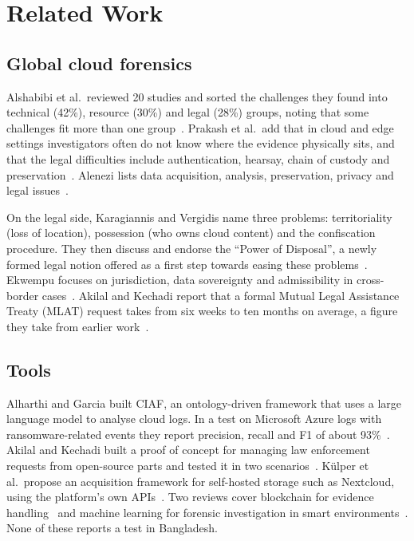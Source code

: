 \documentclass[conference]{IEEEtran}
\begin{document}
\section{Related Work}
\subsection{Global cloud forensics}
Alshabibi et al.\ reviewed 20 studies and sorted the challenges they found into technical (42\%), resource (30\%) and legal (28\%) groups, noting that some challenges fit more than one group~\cite{alshabibi}. Prakash et al.\ add that in cloud and edge settings investigators often do not know where the evidence physically sits, and that the legal difficulties include authentication, hearsay, chain of custody and preservation~\cite{prakash}. Alenezi lists data acquisition, analysis, preservation, privacy and legal issues~\cite{alenezi}.

On the legal side, Karagiannis and Vergidis name three problems: territoriality (loss of location), possession (who owns cloud content) and the confiscation procedure. They then discuss and endorse the ``Power of Disposal'', a newly formed legal notion offered as a first step towards easing these problems~\cite{karagiannis}. Ekwempu focuses on jurisdiction, data sovereignty and admissibility in cross-border cases~\cite{ekwempu}. Akilal and Kechadi report that a formal Mutual Legal Assistance Treaty (MLAT) request takes from six weeks to ten months on average, a figure they take from earlier work~\cite{akilal}.

\subsection{Tools}
Alharthi and Garcia built CIAF, an ontology-driven framework that uses a large language model to analyse cloud logs. In a test on Microsoft Azure logs with ransomware-related events they report precision, recall and F1 of about 93\%~\cite{ciaf}. Akilal and Kechadi built a proof of concept for managing law enforcement requests from open-source parts and tested it in two scenarios~\cite{akilal}. K\"ulper et al.\ propose an acquisition framework for self-hosted storage such as Nextcloud, using the platform's own APIs~\cite{kulper}. Two reviews cover blockchain for evidence handling~\cite{igonor} and machine learning for forensic investigation in smart environments~\cite{tageldin}. None of these reports a test in Bangladesh.
\end{document}
